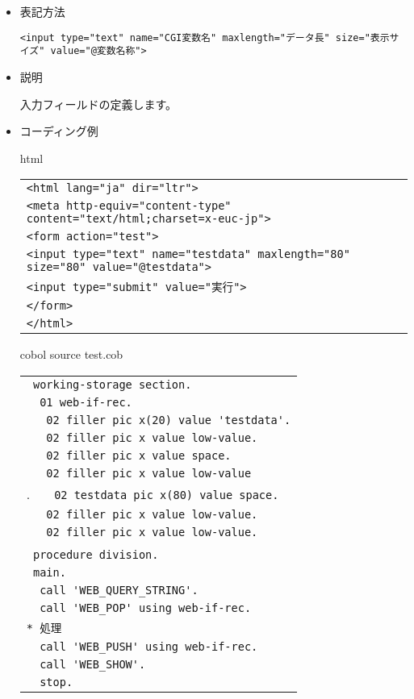 \begin{itemize}

\item{表記方法}

\verb+<input type="text" name="CGI変数名" maxlength="データ長" size="表示サイズ" value="@変数名称">+

\item{説明}

入力フィールドの定義します。

\item{コーディング例}


{\gt html}

\begin{tabular}{|l|}
\hline
\verb+<html lang="ja" dir="ltr">+\\
\verb+<meta http-equiv="content-type" content="text/html;charset=x-euc-jp">+\\
\verb+<form action="test">+\\
\verb+<input type="text" name="testdata" maxlength="80" size="80" value="@testdata">+\\
\verb+<input type="submit" value="実行">+\\
\verb+</form>+\\
\verb+</html>+\\
\hline
\end{tabular}

{\gt cobol} source test.cob

\begin{tabular}{|l|}
\hline
\verb+ working-storage section.+\\
\verb+  01 web-if-rec.+\\
\verb+   02 filler pic x(20) value 'testdata'.+\\
\verb+   02 filler pic x value low-value.+\\
\verb+   02 filler pic x value space.+\\
\verb+   02 filler pic x value low-value+\\.
\verb+   02 testdata pic x(80) value space.+\\
\verb+   02 filler pic x value low-value.+\\
\verb+   02 filler pic x value low-value.+\\
\verb++\\
\verb+ procedure division.+\\
\verb+ main.+\\
\verb+  call 'WEB_QUERY_STRING'.+\\
\verb+  call 'WEB_POP' using web-if-rec.+\\
\verb+* 処理+\\
\verb+  call 'WEB_PUSH' using web-if-rec.+\\
\verb+  call 'WEB_SHOW'.+\\
\verb+  stop.+\\
\hline
\end{tabular}

\end{itemize}

